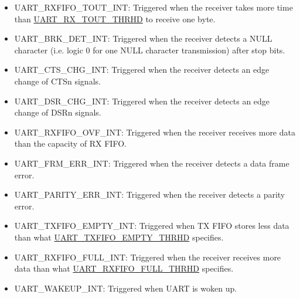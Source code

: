 \documentclass[main\_\_EN.tex]{subfiles}
\begin{document}
\begin{itemize}
\item \label{int:UARTRXFIFOTOUTINT}UART\_RXFIFO\_TOUT\_INT: Triggered when the receiver takes more time than \hyperref[fielddesc:UARTRXTOUTTHRHD]{UART\_RX\_TOUT\_THRHD} to receive one byte.
\item \label{int:UARTBRKDETINT}UART\_BRK\_DET\_INT: Triggered when the receiver detects a NULL character (i.e. logic 0 for one NULL character transmission) after stop bits.
\item \label{int:UARTCTSCHGINT}UART\_CTS\_CHG\_INT: Triggered when the receiver detects an edge change of CTSn signals.
\item \label{int:UARTDSRCHGINT}UART\_DSR\_CHG\_INT: Triggered when the receiver detects an edge change of DSRn signals.
\item \label{int:UARTRXFIFOOVFINT}UART\_RXFIFO\_OVF\_INT: Triggered when the receiver receives more data than the capacity of RX FIFO.
\item \label{int:UARTFRMERRINT}UART\_FRM\_ERR\_INT: Triggered when the receiver detects a data frame error.
\item \label{int:UARTPARITYERRINT}UART\_PARITY\_ERR\_INT: Triggered when the receiver detects a parity error.
\item \label{int:UARTTXFIFOEMPTYINT}UART\_TXFIFO\_EMPTY\_INT: Triggered when TX FIFO stores less data than what \hyperref[fielddesc:UARTTXFIFOEMPTYTHRHD]{UART\_TXFIFO\_EMPTY\_THRHD} specifies.
\item \label{int:UARTRXFIFOFULLINT}UART\_RXFIFO\_FULL\_INT: Triggered when the receiver receives more data than what \hyperref[fielddesc:UARTRXFIFOFULLTHRHD]{UART\_RXFIFO\_FULL\_THRHD} specifies.
\item \label{int:UARTWAKEUPINT}UART\_WAKEUP\_INT: Triggered when UART is woken up.
\end{itemize}
\end{document}
